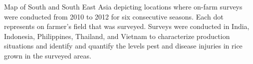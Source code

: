 Map of South and South East Asia depicting locations where on-farm surveys were conducted from 2010 to 2012 for six consecutive seasons. Each dot represents on farmer's field that was surveyed. Surveys were conducted in India, Indonesia, Philippines, Thailand, and Vietnam to characterize production situations and identify and quantify the levels pest and disease injuries in rice grown in the surveyed areas.